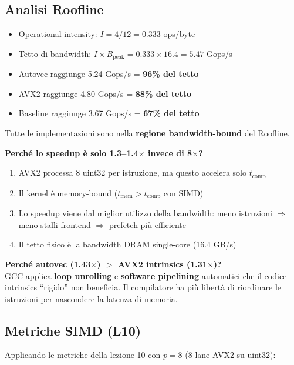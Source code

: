 \documentclass[11pt,a4paper]{article}
\begin{document}
\subsection{Analisi Roofline}

\begin{resultbox}
\begin{itemize}
    \item Operational intensity: $I = 4/12 = 0.333$ ops/byte
    \item Tetto di bandwidth: $I \times B_\text{peak} = 0.333 \times 16.4 = 5.47$ Gops/s
    \item Autovec raggiunge 5.24 Gops/s = \textbf{96\% del tetto}
    \item AVX2 raggiunge 4.80 Gops/s = \textbf{88\% del tetto}
    \item Baseline raggiunge 3.67 Gops/s = \textbf{67\% del tetto}
\end{itemize}
Tutte le implementazioni sono nella \textbf{regione bandwidth-bound} del Roofline.
\end{resultbox}

\textbf{Perché lo speedup è solo 1.3--1.4$\times$ invece di 8$\times$?}
\begin{enumerate}
    \item AVX2 processa 8 uint32 per istruzione, ma questo accelera solo $t_\text{comp}$
    \item Il kernel è memory-bound ($t_\text{mem} > t_\text{comp}$ con SIMD)
    \item Lo speedup viene dal miglior utilizzo della bandwidth: meno istruzioni $\Rightarrow$ meno stalli frontend $\Rightarrow$ prefetch più efficiente
    \item Il tetto fisico è la bandwidth DRAM single-core (16.4 GB/s)
\end{enumerate}

\textbf{Perché autovec (1.43$\times$) $>$ AVX2 intrinsics (1.31$\times$)?}\\
GCC applica \textbf{loop unrolling} e \textbf{software pipelining} automatici che il codice intrinsics ``rigido'' non beneficia. Il compilatore ha più libertà di riordinare le istruzioni per nascondere la latenza di memoria.

\subsection{Metriche SIMD (L10)}

Applicando le metriche della lezione 10 con $p = 8$ (8 lane AVX2 su uint32):
\end{document}
